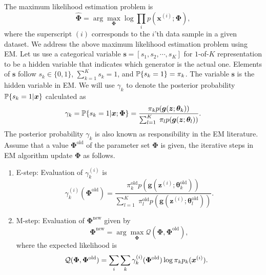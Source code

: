 The maximum likelihood estimation problem is
\begin{equation}\label{eq:max-genmm}
  \hat{\bm{\Phi}} =    \arg \max_{\bm{\Phi}} \log \textstyle\prod_{i} p(\bm{x}^{(i)};\bm{\Phi}),
\end{equation}
where the superscript $(i)$ corresponds to the $i$'th data sample in a given dataset.
We address the above maximum likelihood estimation problem using EM. 
Let us use a categorical variable $\bm{s} = [s_1, s_2, \cdots, s_K]$
for $1$-of-$K$ representation to be a hidden variable that indicates which generator is the actual one. Elements of $\bm{s}$ follow $s_k \in \{0,1\}$, $\sum_{k=1}^K s_k =1$, and $\mathbb{P}\{s_k=1\}=\pi_k$. The variable $\bm{s}$ is the hidden variable in EM. We will use $\gamma_k$ to denote the posterior probability $\mathbb{P}\{s_k =1|\bm{x}\}$ calculated as
\begin{align}\label{eq-genmm-gamma}
  \gamma_k = \mathbb{P}\{s_k =1|\bm{x};\bm{\Phi}\}  
  = \frac{\pi_k p(\bm{g}(\bm{z};\bm{\theta}_k))}{\sum_{l=1}^K\; \pi_l p(\bm{g}(\bm{z};\bm{\theta}_l))}.
\end{align}
The posterior probability $\gamma_k$ is also known as responsibility in the EM literature.
Assume that a value $\bm{\Phi}^{\mathrm{old}}$ of the parameter set $\bm{\Phi}$ is given, the iterative steps in EM algorithm update $\bm{\Phi}$ as follows.
\begin{enumerate}
\item E-step: Evaluation of $\gamma_{k}^{(i)}$ is 
  \begin{equation}\label{eq-genmm-e-step}
    \gamma_{k}^{(i)}(\bm{\Phi}^{\mathrm{old}}) = \frac{\pi_k^\mathrm{{old}} p(\bm{g}(\bm{z}^{(i)};\bm{\theta}_k^{\mathrm{old}}))}{\sum_{l=1}^K\; \pi_l^\mathrm{{old}} p(\bm{g}(\bm{z}^{(i)};\bm{\theta}_l^{\mathrm{old}}))}.   
  \end{equation}
\item M-step: Evaluation of $\bm{\Phi}^{\mathrm{new}}$ given by
  \begin{equation}\label{eq-genmm-opt}
    \bm{\Phi}^{\mathrm{new}} =   \arg \max_{\bm{\Phi}} \mathcal{Q} (\bm{\Phi},\bm{\Phi}^{\mathrm{old}}),  
  \end{equation}
  where the expected likelihood is
  \begin{equation}
    \hspace{-8pt}\mathcal{Q} (\bm{\Phi},\bm{\Phi}^{\mathrm{old}}) = \sum_{i}\sum_{k} \gamma_{k}^{(i)}(\bm{\Phi}^{\mathrm{old}}) \log \pi_k p_k(\bm{x}^{(i)}).
  \end{equation}
\end{enumerate}

